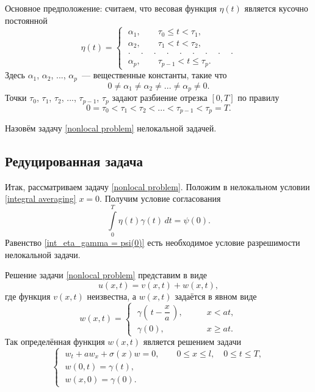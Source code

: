 \documentclass{article}
\renewcommand{\le}{\leqslant}
\renewcommand{\ge}{\geqslant}
\theoremstyle{definition}
\begin{document}
Основное предположение: считаем, что весовая функция $ \eta(t) $ является кусочно постоянной
\begin{equation} \label{eta(t)}
\eta(t) = 
	\begin{cases}
	\; \alpha_1, \qquad \tau_0 \le t < \tau_1, \\
	\; \alpha_2, \qquad \tau_1 < t < \tau_2, \\
	\; .\phantom{-}.\phantom{-}.\phantom{-}.\phantom{-}.\phantom{-}.\phantom{-}.\phantom{-}.\phantom{-}. \\
	\; \alpha_p, \qquad \tau_{p - 1} < t \le \tau_p.
	\end{cases}
\end{equation}
Здесь $\alpha_1$, $\alpha_2$, ..., $\alpha_p$~--- вещественные константы, такие что
\begin{equation*}
	0 \not= \alpha_1 \not= \alpha_2 \not= ... \not= \alpha_p \not= 0.
\end{equation*}
Точки $\tau_0$, $\tau_1$, $\tau_2$, ..., $\tau_{p - 1}$, $\tau_p$ задают разбиение отрезка $[0,T]$ по правилу
\begin{equation*}
	0 = \tau_0 < \tau_1 < \tau_2 < ... < \tau_{p - 1} < \tau_p = T.
\end{equation*}

Назовём задачу \eqref{nonlocal problem} нелокальной задачей.

\subsection{Редуцированная задача}

Итак, рассматриваем задачу \eqref{nonlocal problem}. Положим в нелокальном условии \eqref{integral averaging} \linebreak $x = 0$. 
Получим условие согласования
\begin{equation} \label{int_eta_gamma = psi(0)}
	\int\limits_{0}^{T} \eta(t) \gamma(t)\,dt = \psi(0).
\end{equation}
Равенство \eqref{int_eta_gamma = psi(0)} есть необходимое условие разрешимости нелокальной задачи.

Решение задачи \eqref{nonlocal problem} представим в виде
\begin{equation*}
	u(x,t) = v(x,t) + w(x,t),
\end{equation*}
где функция $v(x,t)$ неизвестна, а $w(x,t)$ задаётся в явном виде
\begin{equation} \label{w(x,t)}
w(x,t) = 
	\begin{cases}
	\; \gamma\!\left(\,t - \dfrac{x}{a}\,\right)\!, & \qquad x < at, \\[3mm]
	\; \gamma(0), & \qquad x \ge at.
	\end{cases}
\end{equation}
Так определённая функция $w(x,t)$ является решением задачи
\begin{equation*}
\begin{cases}
	\; w_t + aw_x + \sigma(x)w = 0, \qquad 0 \le x \le l, \quad 0 \le t \le T, \\[1mm]
	\; w(0,t) = \gamma(t), \\[1mm]
	\; w(x,0) = \gamma(0).
\end{cases}
\end{equation*}
\end{document}
